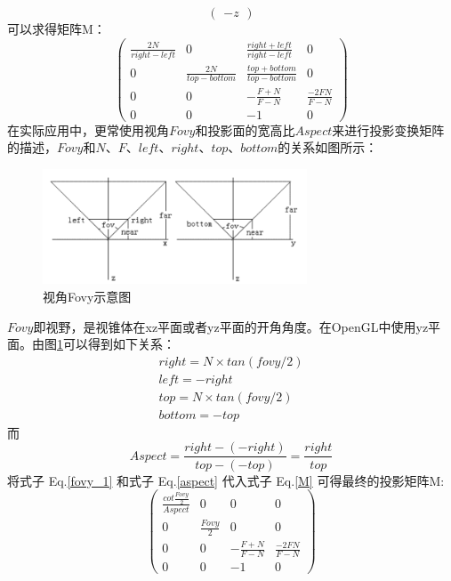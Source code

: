 \begin{spacing}{2.5}
\begin{equation}
\begin{pmatrix}
		-z
	\end{pmatrix}
	\end{equation}
	可以求得矩阵M：
	\begin{equation}
		\begin{pmatrix}
		\frac{2N}{right-left} & 0 & \frac{right+left}{right-left} &0 \\ 
		0 & \frac{2N}{top-bottom} & \frac{top+bottom}{top-bottom} &0 \\ 
		0 & 0 & -\frac{F+N}{F-N} &\frac{-2FN}{F-N} \\ 
		0 & 0 & -1 &0 
	\end{pmatrix}
	\label{M}
	\end{equation}
	在实际应用中，更常使用视角$Fovy$和投影面的宽高比$Aspect$来进行投影变换矩阵的描述，$Fovy$和$N、F、left、right、top、bottom$的关系如图所示：
	\begin{figure}[H]
		\centering
		\includegraphics[width=0.7\textwidth]{images/fovy.png}
		\caption{视角Fovy示意图}
		\label{fovy}
	\end{figure}
	$Fovy$即视野，是视锥体在xz平面或者yz平面的开角角度。在OpenGL中使用yz平面。由图\ref{fovy}可以得到如下关系：
	\begin{equation}
		\begin{split}
			right = N \times tan(fovy/2)\\
			left = -right\\
			top = N \times tan(fovy/2)\\
			bottom = -top 
		\end{split}
		\label{fovy_1}
	\end{equation}
	而
	\begin{equation}
	Aspect = \frac{right-(-right)}{top-(-top)} = \frac{right}{top}
	\label{aspect}
	\end{equation}
	将式子 Eq.\ref{fovy_1} 和式子 Eq.\ref{aspect} 代入式子 Eq.\ref{M} 可得最终的投影矩阵M:
	\begin{equation}
		\begin{pmatrix}
		\frac{cot\frac{Fovy}{2}}{Aspect} & 0 &0 &0 \\ 
		0 & \frac{Fovy}{2} & 0 &0 \\ 
		0 & 0 & -\frac{F+N}{F-N} &\frac{-2FN}{F-N} \\ 
		0 & 0 & -1 &0 
	\end{pmatrix}
	\label{M_1}
	\end{equation}
	\end{spacing}
	
